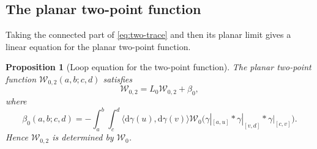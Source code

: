 \documentclass[11pt,a4paper]{article}
\newtheorem{proposition}[theorem]{Proposition}
\newcommand{\cW}{\mathcal{W}}
\newcommand{\dd}{\mathrm{d}}
\begin{document}
\subsection{The planar two-point function}


Taking the connected part of \eqref{eq:two-trace} and then its planar limit gives a linear equation for the planar two-point function. 

\begin{proposition}[Loop equation for the two-point function]
\label{prop:W2-loop}
The planar two-point function $\cW_{0,2}(a,b;c,d)$ satisfies
\begin{equation}\label{eq:W2-loop}
  \cW_{0,2}=L_0\cW_{0,2}+\beta_0,
\end{equation}
where
\begin{equation}\label{eq:beta0}
\beta_0(a,b;c,d) = -\int_a^b\!\!\int_c^d \bigl\langle\dd\gamma(u),\dd\gamma(v)\bigr\rangle \cW_0\bigl( \gamma|_{[a,u]}* \gamma|_{[v,d]}* \gamma|_{[c,v]} \bigr).
\end{equation}
Hence $\cW_{0,2}$ is determined by $\cW_0$.
\end{proposition}
\end{document}
